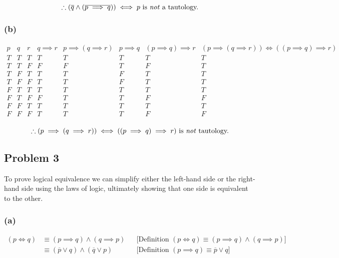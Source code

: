 \documentclass[10pt]{article}
\begin{document}
$$\therefore (\overline{q} \land (\overline{p \implies q})) \iff p \textrm{ is
  \emph{not} a tautology.}$$

\subsubsection*{(b)}

\begin{displaymath}
  \begin{array}{c|c|c|c|c|c|c|c}
    p & q & r & q \implies r & p \implies (q \implies r) & p \implies q & (p
    \implies q) \implies r & (p \implies (q \implies r)) \iff ((p \implies q)
    \implies r) \\
    \hline
    T & T & T & T & T & T & T & T \\
    T & T & F & F & F & T & F & T \\
    T & F & T & T & T & F & T & T \\
    T & F & F & T & T & F & T & T \\
    F & T & T & T & T & T & T & T \\
    F & T & F & F & T & T & F & F \\
    F & F & T & T & T & T & T & T \\
    F & F & F & T & T & T & F & F \\
  \end{array}
\end{displaymath}

$$\therefore (p \implies (q \implies r)) \iff ((p \implies q) \implies r)
\textrm{ is \emph{not} tautology.}$$

\subsection*{Problem 3}

To prove logical equivalence we can simplify either the left-hand side or the
right-hand side using the laws of logic, ultimately showing that one side is
equivalent to the other.

\subsubsection*{(a)}

\begin{align*}
  (p \iff q) &\equiv (p \implies q) \land (q \implies p) && \text{[Definition }
  (p \iff q) \equiv (p \implies q) \land (q \implies p)] \\
    &\equiv (\overline{p} \lor q) \land (\overline{q} \lor p) && \text{[Definition }
    (p \implies q) \equiv \overline{p} \lor q]
\end{align*}
\end{document}

